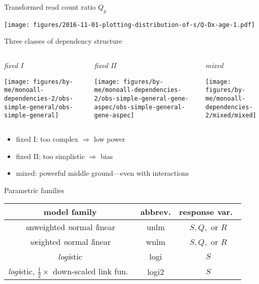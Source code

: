 \documentclass{beamer}
\begin{document}
\begin{frame}[label=transformed]{Transformed read count ratio \(Q_g\)}
\begin{center}
\texttt{[image: figures/2016-11-01-plotting-distribution-of-s/Q-Dx-age-1.pdf]}
\end{center}
\end{frame}


\begin{frame}{Three classes of dependency structure}
\begin{columns}[t]
\begin{column}{0.33\textwidth}
\emph{fixed I}

\texttt{[image: figures/by-me/monoall-dependencies-2/obs-simple-general/obs-simple-general]}
\end{column}

\begin{column}{0.33\textwidth}
\emph{fixed II}

\texttt{[image: figures/by-me/monoall-dependencies-2/obs-simple-general-gene-aspec/obs-simple-general-gene-aspec]}
\end{column}
\begin{column}{0.33\textwidth}
\emph{mixed}

\texttt{[image: figures/by-me/monoall-dependencies-2/mixed/mixed]}
\end{column}
\end{columns}
\vfill
\begin{itemize}
\item fixed I: too complex \(\Rightarrow\) low power
\item fixed II: too simplistic \(\Rightarrow\) bias
\item mixed: powerful middle ground---even with interactions
\end{itemize}
\end{frame}


\begin{frame}{Parametric families}
\begin{table}[H]
\begin{center}
\begin{tabular}{ccc}
model family & abbrev. & response var.~\\
\hline
\emph{u}nweighted \emph{n}ormal \emph{l}inear & unlm  & \(S, Q,\) or \(R\) \\
\emph{w}eighted \emph{n}ormal \emph{l}inear & wnlm  & \(S, Q,\) or \(R\) \\
\emph{logi}stic & logi & \(S\) \\
\emph{logi}stic, \(\frac{1}{2}\times\) down-scaled link fun.~& logi2 & \(S\) \\
\end{tabular}
\end{center}
\end{table}
\end{frame}
\end{document}

